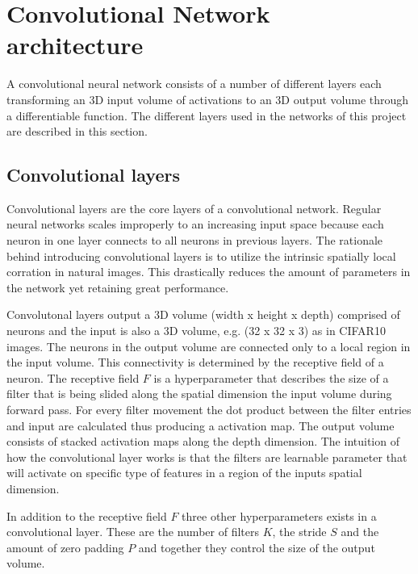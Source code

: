 \graphicspath{{Chapters/Project/}}

\section{Convolutional Network architecture} %
\label{sec:convolutional_network_architecture}

A convolutional neural network consists of a number of different layers each transforming an 3D input volume of activations to an 3D output volume through a differentiable function. The different layers used in the networks of this project are described in this section. 

\subsection{Convolutional layers} %
\label{sub:conv_layers}

Convolutional layers are the core layers of a convolutional network. Regular neural networks scales improperly to an increasing input space because each neuron in one layer connects to all neurons in previous layers. The rationale behind introducing convolutional layers is to utilize the intrinsic spatially local corration in natural images. This drastically reduces the amount of parameters in the network yet retaining great performance.

Convolutonal layers output a 3D volume (width x height x depth) comprised of neurons and the input is also a 3D volume, e.g. (32 x 32 x 3) as in CIFAR10 images. The neurons in the output volume are connected only to a local region in the input volume. This connectivity is determined by the receptive field of a neuron. The receptive field $F$ is a hyperparameter that describes the size of a filter that is being slided along the spatial dimension the input volume during forward pass. For every filter movement the dot product between the filter entries and input are calculated thus producing a activation map. The output volume consists of stacked activation maps along the depth dimension. The intuition of how the convolutional layer works is that the filters are learnable parameter that will activate on specific type of features in a region of the inputs spatial dimension.

In addition to the receptive field $F$ three other hyperparameters exists in a convolutional layer. These are the number of filters $K$, the stride $S$ and the amount of zero padding $P$ and together they control the size of the output volume. 

